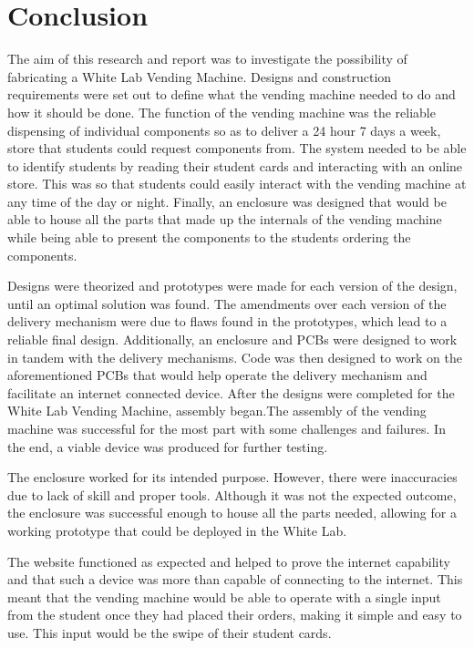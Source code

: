 \documentclass[a4paper,11pt]{article}
\numberwithin{figure}{section}
\numberwithin{table}{section}
\begin{document}
\section{Conclusion}\thispagestyle{sectionstart}
The aim of this research and report was to investigate the possibility of fabricating a White Lab Vending Machine. Designs and construction requirements were set out to define what the vending machine needed to do and how it should be done. The function of the vending machine was the reliable dispensing of individual components so as to deliver a 24 hour 7 days a week, store that students could request components from. The system needed to be able to identify students by reading their student cards and interacting with an online store. This was so that students could easily interact with the vending machine at any time of the day or night. Finally, an enclosure was designed that would be able to house all the parts that made up the internals of the vending machine while being able to present the components to the students ordering the components.

Designs were theorized and prototypes were made for each version of the design, until an optimal solution was found. The amendments over each version of the delivery mechanism were due to flaws found in the prototypes, which lead to a reliable final design. Additionally, an enclosure and PCBs were designed to work in tandem with the delivery mechanisms. Code was then designed to work on the aforementioned PCBs that would help operate the delivery mechanism and facilitate an internet connected device. After the designs were completed for the White Lab Vending Machine, assembly began.The assembly of the vending machine was successful for the most part with some challenges and failures. In the end, a viable device was produced for further testing. 

The enclosure worked for its intended purpose. However, there were inaccuracies due to lack of skill and proper tools. Although it was not the expected outcome, the enclosure was successful enough to house all the parts needed, allowing for a working prototype that could be deployed in the White Lab.

The website functioned as expected and helped to prove the internet capability and that such a device was more than capable of connecting to the internet. This meant that the vending machine would be able to operate with a single input from the student once they had placed their orders, making it simple and easy to use. This input would be the swipe of their student cards. 
\end{document}
